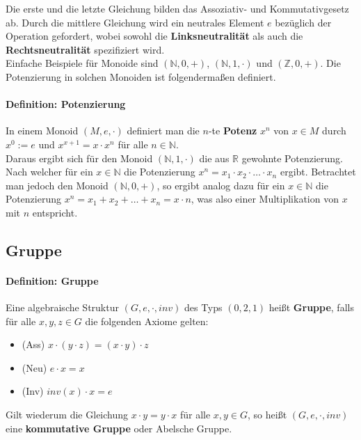 Die erste und die letzte Gleichung bilden das Assoziativ- und Kommutativgesetz ab. Durch die mittlere Gleichung wird ein neutrales Element $e$ bezüglich der Operation gefordert, wobei sowohl die \textbf{Linksneutralität} als auch die \textbf{Rechtsneutralität} spezifiziert wird.\\

Einfache Beispiele für Monoide sind $(\mathbb{N},0,+)$, $(\mathbb{N},1,\cdot)$ und $(\mathbb{Z},0,+)$. Die Potenzierung in solchen Monoiden ist folgendermaßen definiert.

\paragraph{Definition: Potenzierung}
In einem Monoid $(M,e,\cdot)$ definiert man die $n$-te \textbf{Potenz} $x^n$ von $x \in M$ durch $x^0 := e$ und $x^{x+1} = x \cdot x^n$ für alle $n \in \mathbb{N}$.\\

Daraus ergibt sich für den Monoid $(\mathbb{N},1,\cdot)$ die aus $\mathbb{R}$ gewohnte Potenzierung. Nach welcher für ein $x \in \mathbb{N}$ die Potenzierung $x^n = x_1 \cdot x_2 \cdot \dots \cdot x_n$ ergibt. Betrachtet man jedoch den Monoid $(\mathbb{N},0,+)$, so ergibt analog dazu für ein $x \in \mathbb{N}$ die Potenzierung $x^n = x_1 + x_2 + \dots + x_n = x \cdot n$, was also einer Multiplikation von $x$ mit $n$ entspricht.

\subsection{Gruppe}

\paragraph{Definition: Gruppe}
Eine algebraische Struktur $(G,e,\cdot,inv)$ des Typs $(0,2,1)$ heißt \textbf{Gruppe}, falls für alle $x,y,z \in G$ die folgenden Axiome gelten:

\begin{itemize}
    \item (Ass)    $x \cdot (y \cdot z) = (x \cdot y) \cdot z$
    \item (Neu)    $e \cdot x = x$
    \item (Inv)    $inv(x) \cdot x = e$
\end{itemize}

Gilt wiederum die Gleichung $x \cdot y = y \cdot x$ für alle $x,y \in G$, so heißt $(G,e,\cdot,inv)$ eine \textbf{kommutative Gruppe} oder Abelsche Gruppe.

